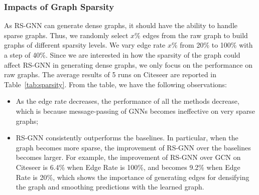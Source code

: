 \subsubsection{Impacts of Graph Sparsity} As RS-GNN can generate dense graphs, it should have the ability to handle sparse graphs. Thus, we randomly select $x\%$ edges from the raw graph to build graphs of different sparsity levels. We vary edge rate $x\%$ from 20\% to 100\% with a step of 40\%. Since we are interested in how the sparsity of the graph could affect RS-GNN in generating dense graphs, we only focus on the performance on raw graphs. 
The average results of 5 runs on Citeseer are reported in Table~\ref{tab:sparsity}. From the table, we have the following observations:
\begin{itemize}[leftmargin=*]
    \item As the edge rate decreases, the performance of all the methods decrease, which is because message-passing of GNNs becomes ineffective on very sparse graphs;
    \item RS-GNN consistently outperforms the baselines. In particular, when the graph becomes more sparse, the improvement of RS-GNN over the baselines becomes larger. For example, the improvement of RS-GNN over GCN on Citeseer is 6.4\% when Edge Rate is 100\%, and becomes 9.2\% when Edge Rate is 20\%, which shows the importance of generating edges for densifying the graph and smoothing predictions with the learned graph. 
\end{itemize}


